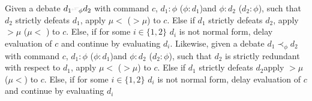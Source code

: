 \documentclass{IOS-Book-Article}
\begin{document}
\begin{definition}
  Given a debate $d_1\leftattack_\phi d_2$ with command $c$, $d_1:\phi$ ($\phi:d_1$)and $\phi:d_2$ ($d_2:\phi$), such that $d_2$ strictly defeats $d_1$, apply $\mu <$ ($> \mu$) to $c$. Else if $d_1$ strictly defeats $d_2$,  apply $> \mu$ ($\mu <$ ) to $c$. Else, if for some $i\in\{1,2\}$ $d_i$ is not normal form, delay evaluation of $c$  and continue by evaluating $d_i$.
  Likewise, given a debate $d_1\prec_\phi d_2$ with command $c$, $d_1:\phi$ ($\phi:d_1$)and $\phi:d_2$ ($d_2:\phi$), such that $d_2$ is strictly redundant with respect to $d_1$, apply $\mu <$ ($> \mu$) to $c$.  Else if $d_1$ strictly defeats $d_2$apply $> \mu$ ($\mu <$) to $c$. Else, if for some $i\in\{1,2\}$ $d_i$ is not normal form, delay evaluation of $c$  and continue by evaluating $d_i$
\end{definition}
\end{document}
